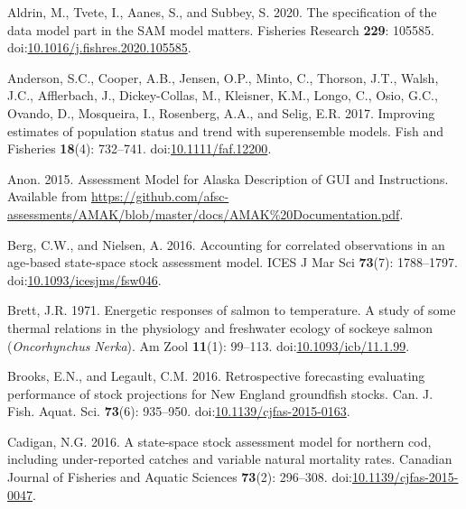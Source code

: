 \documentclass[]{article}
\begin{document}
\leavevmode\hypertarget{ref-aldrin2020Specification}{}%
Aldrin, M., Tvete, I., Aanes, S., and Subbey, S. 2020. The specification
of the data model part in the SAM model matters. Fisheries Research
\textbf{229}: 105585.
doi:\href{https://doi.org/10.1016/j.fishres.2020.105585}{10.1016/j.fishres.2020.105585}.

\leavevmode\hypertarget{ref-anderson2017Improving}{}%
Anderson, S.C., Cooper, A.B., Jensen, O.P., Minto, C., Thorson, J.T.,
Walsh, J.C., Afflerbach, J., Dickey-Collas, M., Kleisner, K.M., Longo,
C., Osio, G.C., Ovando, D., Mosqueira, I., Rosenberg, A.A., and Selig,
E.R. 2017. Improving estimates of population status and trend with
superensemble models. Fish and Fisheries \textbf{18}(4): 732--741.
doi:\href{https://doi.org/10.1111/faf.12200}{10.1111/faf.12200}.

\leavevmode\hypertarget{ref-anon2015AMAK}{}%
Anon. 2015. Assessment Model for Alaska Description of GUI and
Instructions. Available from
\url{https://github.com/afsc-assessments/AMAK/blob/master/docs/AMAK\%20Documentation.pdf}.

\leavevmode\hypertarget{ref-berg2016Accounting}{}%
Berg, C.W., and Nielsen, A. 2016. Accounting for correlated observations
in an age-based state-space stock assessment model. ICES J Mar Sci
\textbf{73}(7): 1788--1797.
doi:\href{https://doi.org/10.1093/icesjms/fsw046}{10.1093/icesjms/fsw046}.

\leavevmode\hypertarget{ref-brett1971Energetic}{}%
Brett, J.R. 1971. Energetic responses of salmon to temperature. A study
of some thermal relations in the physiology and freshwater ecology of
sockeye salmon (\emph{Oncorhynchus} \emph{Nerka}). Am Zool
\textbf{11}(1): 99--113.
doi:\href{https://doi.org/10.1093/icb/11.1.99}{10.1093/icb/11.1.99}.

\leavevmode\hypertarget{ref-brooks2016Retrospective}{}%
Brooks, E.N., and Legault, C.M. 2016. Retrospective forecasting
evaluating performance of stock projections for New England groundfish
stocks. Can. J. Fish. Aquat. Sci. \textbf{73}(6): 935--950.
doi:\href{https://doi.org/10.1139/cjfas-2015-0163}{10.1139/cjfas-2015-0163}.

\leavevmode\hypertarget{ref-cadigan2016Statespace}{}%
Cadigan, N.G. 2016. A state-space stock assessment model for northern
cod, including under-reported catches and variable natural mortality
rates. Canadian Journal of Fisheries and Aquatic Sciences
\textbf{73}(2): 296--308.
doi:\href{https://doi.org/10.1139/cjfas-2015-0047}{10.1139/cjfas-2015-0047}.
\end{document}
